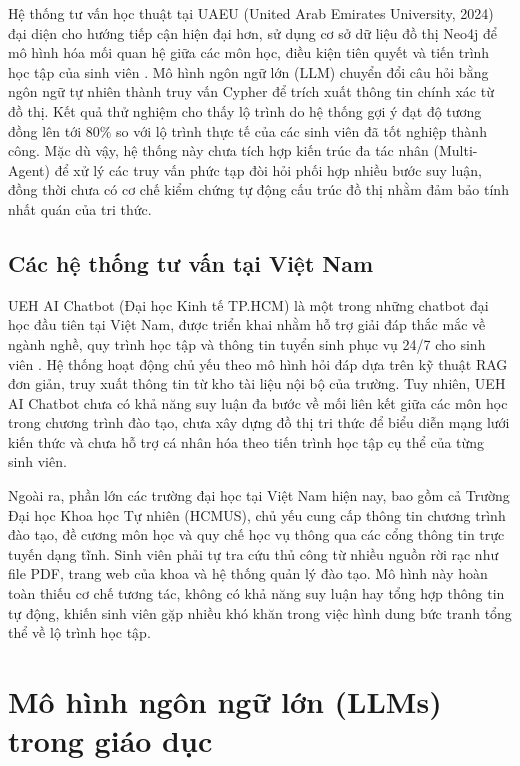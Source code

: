 Hệ thống tư vấn học thuật tại UAEU (United Arab Emirates University, 2024) đại diện cho hướng tiếp cận hiện đại hơn, sử dụng cơ sở dữ liệu đồ thị Neo4j để mô hình hóa mối quan hệ giữa các môn học, điều kiện tiên quyết và tiến trình học tập của sinh viên \cite{uaeu_kg_advising2024}. Mô hình ngôn ngữ lớn (LLM) chuyển đổi câu hỏi bằng ngôn ngữ tự nhiên thành truy vấn Cypher để trích xuất thông tin chính xác từ đồ thị. Kết quả thử nghiệm cho thấy lộ trình do hệ thống gợi ý đạt độ tương đồng lên tới 80\% so với lộ trình thực tế của các sinh viên đã tốt nghiệp thành công. Mặc dù vậy, hệ thống này chưa tích hợp kiến trúc đa tác nhân (Multi-Agent) để xử lý các truy vấn phức tạp đòi hỏi phối hợp nhiều bước suy luận, đồng thời chưa có cơ chế kiểm chứng tự động cấu trúc đồ thị nhằm đảm bảo tính nhất quán của tri thức.

\subsection{Các hệ thống tư vấn tại Việt Nam}

UEH AI Chatbot (Đại học Kinh tế TP.HCM) là một trong những chatbot đại học đầu tiên tại Việt Nam, được triển khai nhằm hỗ trợ giải đáp thắc mắc về ngành nghề, quy trình học tập và thông tin tuyển sinh phục vụ 24/7 cho sinh viên \cite{ueh_chatbot2024}. Hệ thống hoạt động chủ yếu theo mô hình hỏi đáp dựa trên kỹ thuật RAG đơn giản, truy xuất thông tin từ kho tài liệu nội bộ của trường. Tuy nhiên, UEH AI Chatbot chưa có khả năng suy luận đa bước về mối liên kết giữa các môn học trong chương trình đào tạo, chưa xây dựng đồ thị tri thức để biểu diễn mạng lưới kiến thức và chưa hỗ trợ cá nhân hóa theo tiến trình học tập cụ thể của từng sinh viên.

Ngoài ra, phần lớn các trường đại học tại Việt Nam hiện nay, bao gồm cả Trường Đại học Khoa học Tự nhiên (HCMUS), chủ yếu cung cấp thông tin chương trình đào tạo, đề cương môn học và quy chế học vụ thông qua các cổng thông tin trực tuyến dạng tĩnh. Sinh viên phải tự tra cứu thủ công từ nhiều nguồn rời rạc như file PDF, trang web của khoa và hệ thống quản lý đào tạo. Mô hình này hoàn toàn thiếu cơ chế tương tác, không có khả năng suy luận hay tổng hợp thông tin tự động, khiến sinh viên gặp nhiều khó khăn trong việc hình dung bức tranh tổng thể về lộ trình học tập.


\section{Mô hình ngôn ngữ lớn (LLMs) trong giáo dục}

